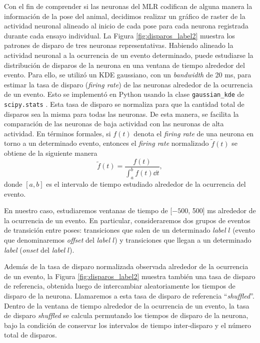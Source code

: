 Con el fin de comprender si las neuronas del MLR codifican de alguna manera la información de la pose del animal, decidimos realizar un gráfico de raster de la actividad neuronal alineado al inicio de cada pose para cada neurona registrada durante cada ensayo individual. La Figura \ref{fig:disparos_label2} muestra los patrones de disparo de tres neuronas representativas. Habiendo alineado la actividad neuronal a la ocurrencia de un evento determinado, puede estudiarse la distribución de disparos de la neurona en una ventana de tiempo alrededor del evento. Para ello, se utilizó un KDE gaussiano, con un \textit{bandwidth} de 20 ms, para estimar la tasa de disparo (\textit{firing rate}) de las neuronas alrededor de la ocurrencia de un evento. Esto se implementó en Python usando la clase \texttt{gaussian\_kde} de \texttt{scipy.stats} \cite{scipy}. Esta tasa de disparo se normaliza para que la cantidad total de disparos sea la misma para todas las neuronas. De esta manera, se facilita la comparación de las neuronas de baja actividad con las neuronas de alta actividad. En términos formales, si $f(t)$ denota el \textit{firing rate} de una neurona en torno a un determinado evento, entonces el \textit{firing rate} normalizado $\tilde{f}(t)$ se obtiene de la siguiente manera
\begin{equation}
    \tilde{f}(t) = \frac{f(t)}{\int_{a}^{b} f(t) \dd{t}},
\end{equation}
donde $[a, b]$ es el intervalo de tiempo estudiado alrededor de la ocurrencia del evento. 

En nuestro caso, estudiaremos ventanas de tiempo de [$-500$, 500] ms alrededor de la ocurrencia de un evento. En particular, consideraremos dos grupos de eventos de transición entre poses: transiciones que salen de un determinado \textit{label} $l$ (evento que denominaremos \textit{offset} del \textit{label $l$}) y transiciones que llegan a un determinado \textit{label} (\textit{onset} del \textit{label} $l$).

Además de la tasa de disparo normalizada observada alrededor de la ocurrencia de un evento, la Figura \ref{fig:disparos_label2} muestra también una tasa de disparo de referencia, obtenida luego de intercambiar aleatoriamente los tiempos de disparo de la neurona. Llamaremos a esta tasa de disparo de referencia ``\textit{shuffled}''. Dentro de la ventana de tiempo alrededor de la ocurrencia de un evento, la tasa de disparo \textit{shuffled} se calcula permutando los tiempos de disparo de la neurona, bajo la condición de conservar los intervalos de tiempo inter-disparo y el número total de disparos.

